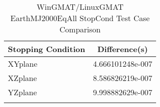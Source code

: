 \begin{table}[htbp!]
\centering
\caption{ WinGMAT/LinuxGMAT EarthMJ2000EqAll StopCond Test Case Comparison}
      \begin{tabular}{lc}
      \hline\hline
          Stopping Condition & Difference(s) \\
         \hline
         XYplane & 4.666101248e-007 \\
         XZplane & 8.586826219e-007 \\
         YZplane & 9.998882629e-007 \\
      \hline\hline
      \label{Table: WinGMAT-LinuxGMAT EarthMJ2000EqAll StopCond Table} 
\end{tabular}
\end{table}
